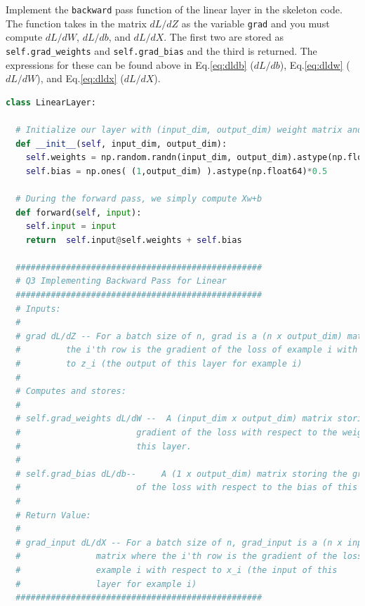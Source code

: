 \documentclass[a4paper,10pt]{article}
\begin{document}
\begin{taskbox}
 Implement the \texttt{backward} pass function of the linear layer in the skeleton code. The function takes in the matrix $dL/dZ$ as the variable \texttt{grad} and you must compute $dL/dW$, $dL/db$, and $dL/dX$. The first two are stored as \texttt{self.grad\_weights} and \texttt{self.grad\_bias} and the third is returned. The expressions for these can be found above in Eq.\ref{eq:dldb} ($dL/db$), Eq.\ref{eq:dldw} ($dL/dW$), and Eq.\ref{eq:dldx} ($dL/dX$).



\begin{center}
\begin{minipage}{0.9\textwidth}
\begin{lstlisting}[language=Python]
class LinearLayer:

  # Initialize our layer with (input_dim, output_dim) weight matrix and a (1,output_dim) bias vector
  def __init__(self, input_dim, output_dim):
    self.weights = np.random.randn(input_dim, output_dim).astype(np.float64)* np.sqrt(2. / input_dim)
    self.bias = np.ones( (1,output_dim) ).astype(np.float64)*0.5

  # During the forward pass, we simply compute Xw+b
  def forward(self, input):
    self.input = input
    return  self.input@self.weights + self.bias

  #################################################
  # Q3 Implementing Backward Pass for Linear
  #################################################
  # Inputs:
  #
  # grad dL/dZ -- For a batch size of n, grad is a (n x output_dim) matrix where 
  #         the i'th row is the gradient of the loss of example i with respect 
  #         to z_i (the output of this layer for example i)
  #
  # Computes and stores:
  #
  # self.grad_weights dL/dW --  A (input_dim x output_dim) matrix storing the 
  #                       gradient of the loss with respect to the weights of 
  #                       this layer. 
  #
  # self.grad_bias dL/db--     A (1 x output_dim) matrix storing the gradient
  #                       of the loss with respect to the bias of this layer. 
  # 
  # Return Value:
  #
  # grad_input dL/dX -- For a batch size of n, grad_input is a (n x input_dim) 
  #               matrix where the i'th row is the gradient of the loss of  
  #               example i with respect to x_i (the input of this 
  #               layer for example i) 
  #################################################
  

\end{lstlisting}
\end{minipage}
\end{center}
\end{taskbox}
\end{document}
